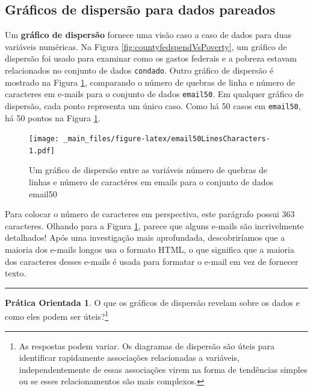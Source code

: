 \documentclass[
]{book}
\theoremstyle{definition}
\theoremstyle{definition}
\theoremstyle{definition}
\newtheorem{exercise}{Prática Orientada}[chapter]
\theoremstyle{definition}
\theoremstyle{remark}
\begin{document}
\hypertarget{scatterPlots}{%
\subsection{Gráficos de dispersão para dados pareados}\label{scatterPlots}}

Um \textbf{gráfico de dispersão} fornece uma visão caso a caso de dados para duas variáveis numéricas. Na Figura \ref{fig:countyfedspendVsPoverty}, um gráfico de dispersão foi usado para examinar como os gastos federais e a pobreza estavam relacionados no conjunto de dados \texttt{condado}. Outro gráfico de dispersão é mostrado na Figura \ref{fig:email50LinesCharacters}, comparando o número de quebras de linha e número de caracteres em e-mails para o conjunto de dados \texttt{email50}. Em qualquer gráfico de dispersão, cada ponto representa um único caso. Como há 50 casos em \texttt{email50}, há 50 pontos na Figura \ref{fig:email50LinesCharacters}.

\begin{figure}
\centering
\texttt{[image: \_main\_files/figure-latex/email50LinesCharacters-1.pdf]}
\caption{\label{fig:email50LinesCharacters}Um gráfico de dispersão entre as variáveis número de quebras de linhas e número de caractéres em emails para o conjunto de dados email50}
\end{figure}

Para colocar o número de caracteres em perspectiva, este parágrafo possui 363 caracteres. Olhando para a Figura \ref{fig:email50LinesCharacters}, parece que alguns e-mails são incrivelmente detalhados! Após uma investigação mais aprofundada, descobriríamos que a maioria dos e-mails longos usa o formato HTML, o que significa que a maioria dos caracteres desses e-mails é usada para formatar o e-mail em vez de fornecer texto.

\begin{center}\rule{0.5\linewidth}{0.5pt}\end{center}

\begin{exercise}
\protect\hypertarget{exr:unnamed-chunk-15}{}{\label{exr:unnamed-chunk-15} }O que os gráficos de dispersão revelam sobre os dados e como eles podem ser úteis?\footnote{As respostas podem variar. Os diagramas de dispersão são úteis para identificar rapidamente associações relacionadas a variáveis, independentemente de essas associações virem na forma de tendências simples ou se esses relacionamentos são mais complexos.}
\end{exercise}
\end{document}
